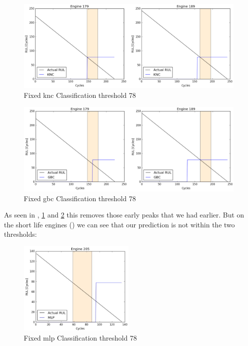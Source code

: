 \documentclass[english, a4paper]{report}
\begin{document}
{{{            \begin{figure}[H]
                \centering
                \includegraphics[width=\textwidth]{Fixed_KNCClassi_78}
                \caption{Fixed \gls{knc} Classification threshold 78}
                \label{fig:FixedKNCClassi78}
            \end{figure}
            
            \begin{figure}[H]
                \centering
                \includegraphics[width=\textwidth]{Fixed_GBCClassi_78}
                \caption{Fixed \gls{gbc} Classification threshold 78}
                \label{fig:FixedGBCClassi78}
            \end{figure}
            
            As seen in , \ref{fig:FixedKNCClassi78} and \ref{fig:FixedGBCClassi78} this removes those early peaks that we had earlier. But on the short life engines () we can see that our prediction is not within the two thresholds: 
            
            \begin{figure}[H]
                \centering
                \includegraphics[width=0.5\textwidth]{Fixed_MLPClassi_78_Eng205}
                \caption{Fixed \gls{mlp} Classification threshold 78}
                \label{fig:FixedMLPClassi78Eng205}
            \end{figure}
            
}}}
\end{document}

